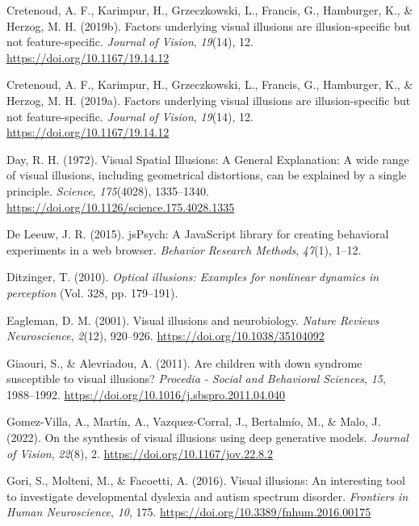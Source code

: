 \documentclass[
  man,floatsintext]{apa6}
\newlength{\cslhangindent}
\newlength{\cslentryspacingunit} %
\newenvironment{CSLReferences}[2] %
 {%
  \setlength{\parindent}{0pt}
  \ifodd #1
  \let\oldpar\par
  \def\par{\hangindent=\cslhangindent\oldpar}
  \fi
  \setlength{\parskip}{#2\cslentryspacingunit}
 }%
 {}
\begin{document}
\begin{CSLReferences}{1}{0}
\leavevmode{}%
Cretenoud, A. F., Karimpur, H., Grzeczkowski, L., Francis, G., Hamburger, K., \& Herzog, M. H. (2019b). Factors underlying visual illusions are illusion-specific but not feature-specific. \emph{Journal of Vision}, \emph{19}(14), 12. \url{https://doi.org/10.1167/19.14.12}

\leavevmode{}%
Cretenoud, A. F., Karimpur, H., Grzeczkowski, L., Francis, G., Hamburger, K., \& Herzog, M. H. (2019a). Factors underlying visual illusions are illusion-specific but not feature-specific. \emph{Journal of Vision}, \emph{19}(14), 12. \url{https://doi.org/10.1167/19.14.12}

\leavevmode{}%
Day, R. H. (1972). Visual Spatial Illusions: A General Explanation: A wide range of visual illusions, including geometrical distortions, can be explained by a single principle. \emph{Science}, \emph{175}(4028), 1335--1340. \url{https://doi.org/10.1126/science.175.4028.1335}

\leavevmode{}%
De Leeuw, J. R. (2015). jsPsych: A JavaScript library for creating behavioral experiments in a web browser. \emph{Behavior Research Methods}, \emph{47}(1), 1--12.

\leavevmode{}%
Ditzinger, T. (2010). \emph{Optical illusions: Examples for nonlinear dynamics in perception} (Vol. 328, pp. 179--191).

\leavevmode{}%
Eagleman, D. M. (2001). Visual illusions and neurobiology. \emph{Nature Reviews Neuroscience}, \emph{2}(12), 920--926. \url{https://doi.org/10.1038/35104092}

\leavevmode{}%
Giaouri, S., \& Alevriadou, A. (2011). Are children with down syndrome susceptible to visual illusions? \emph{Procedia - Social and Behavioral Sciences}, \emph{15}, 1988--1992. \url{https://doi.org/10.1016/j.sbspro.2011.04.040}

\leavevmode{}%
Gomez-Villa, A., Martín, A., Vazquez-Corral, J., Bertalmío, M., \& Malo, J. (2022). On the synthesis of visual illusions using deep generative models. \emph{Journal of Vision}, \emph{22}(8), 2. \url{https://doi.org/10.1167/jov.22.8.2}

\leavevmode{}%
Gori, S., Molteni, M., \& Facoetti, A. (2016). Visual illusions: An interesting tool to investigate developmental dyslexia and autism spectrum disorder. \emph{Frontiers in Human Neuroscience}, \emph{10}, 175. \url{https://doi.org/10.3389/fnhum.2016.00175}


\end{CSLReferences}
\end{document}

